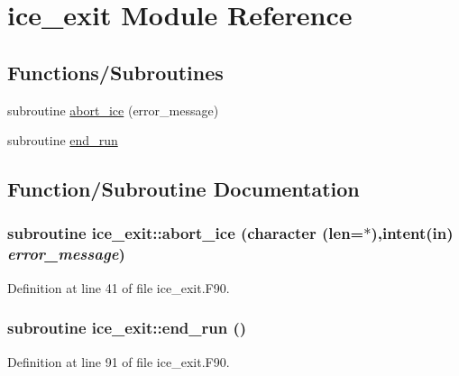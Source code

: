 \hypertarget{namespaceice__exit}{
\section{ice\_\-exit Module Reference}
\label{namespaceice__exit}
}
\subsection*{Functions/Subroutines}
\begin{DoxyCompactItemize}
\item 
subroutine \hyperlink{namespaceice__exit_a3fcf77109320e75f1268f41fe212d789}{abort\_\-ice} (error\_\-message)
\item 
subroutine \hyperlink{namespaceice__exit_a9f6aab7e1aabcf5c3a8e8843eed1bc44}{end\_\-run}
\end{DoxyCompactItemize}


\subsection{Function/Subroutine Documentation}
\hypertarget{namespaceice__exit_a3fcf77109320e75f1268f41fe212d789}{
\subsubsection[{abort\_\-ice}]{\setlength{\rightskip}{0pt plus 5cm}subroutine ice\_\-exit::abort\_\-ice (character (len=$\ast$),intent(in) {\em error\_\-message})}}
\label{namespaceice__exit_a3fcf77109320e75f1268f41fe212d789}


Definition at line 41 of file ice\_\-exit.F90.\hypertarget{namespaceice__exit_a9f6aab7e1aabcf5c3a8e8843eed1bc44}{
\subsubsection[{end\_\-run}]{\setlength{\rightskip}{0pt plus 5cm}subroutine ice\_\-exit::end\_\-run ()}}
\label{namespaceice__exit_a9f6aab7e1aabcf5c3a8e8843eed1bc44}


Definition at line 91 of file ice\_\-exit.F90.